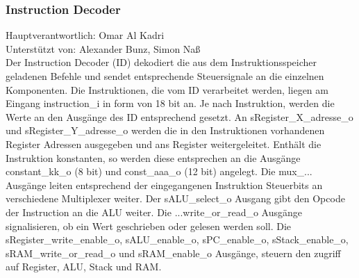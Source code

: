 \documentclass[bibliography=totoc,listof=totoc,index=totoc]{scrartcl}
\begin{document}
\subsubsection{Instruction Decoder}
\begin{multicols}{2}
Hauptverantwortlich: Omar Al Kadri\\
Unterstützt von: Alexander Bunz, Simon Naß\\
Der Instruction Decoder (ID) dekodiert die aus dem Instruktionsspeicher geladenen Befehle und sendet entsprechende Steuersignale an die einzelnen Komponenten. Die Instruktionen, die vom ID verarbeitet werden, liegen am Eingang instruction\_i in form von 18 bit an. Je nach Instruktion, werden die Werte an den Ausgänge des ID entsprechend gesetzt. An sRegister\_X\_adresse\_o und sRegister\_Y\_adresse\_o werden die in den Instruktionen vorhandenen Register Adressen ausgegeben und ans Register weitergeleitet.
Enthält die Instruktion konstanten, so werden diese entsprechen an die Ausgänge constant\_kk\_o (8 bit) und const\_aaa\_o (12 bit) angelegt. Die mux\_... Ausgänge leiten entsprechend der eingegangenen Instruktion Steuerbits an verschiedene Multiplexer weiter. Der sALU\_select\_o Ausgang gibt den Opcode der Instruction an die ALU weiter. Die ...write\_or\_read\_o Ausgänge signalisieren, ob ein Wert geschrieben oder gelesen werden soll. Die sRegister\_write\_enable\_o, sALU\_enable\_o, sPC\_enable\_o, sStack\_enable\_o, sRAM\_write\_or\_read\_o und sRAM\_enable\_o Ausgänge, steuern den zugriff auf Register, ALU, Stack und RAM.
\begin{figure}[H]
    \centering

\end{figure}
\end{multicols}
\end{document}
